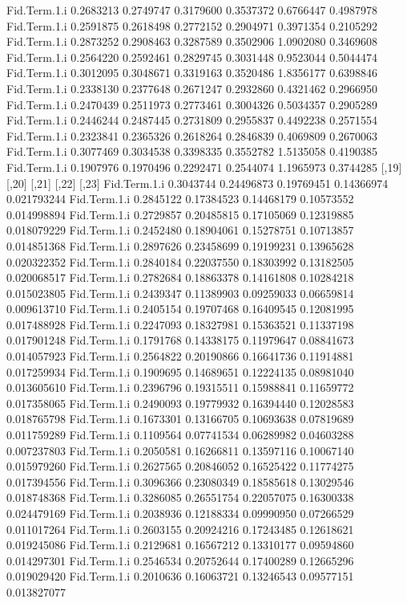 \documentclass[11pt]{article} %
\begin{document}
\begin{Schunk}
\begin{Soutput}
Fid.Term.1.i 0.2683213 0.2749747 0.3179600 0.3537372 0.6766447 0.4987978
Fid.Term.1.i 0.2591875 0.2618498 0.2772152 0.2904971 0.3971354 0.2105292
Fid.Term.1.i 0.2873252 0.2908463 0.3287589 0.3502906 1.0902080 0.3469608
Fid.Term.1.i 0.2564220 0.2592461 0.2829745 0.3031448 0.9523044 0.5044474
Fid.Term.1.i 0.3012095 0.3048671 0.3319163 0.3520486 1.8356177 0.6398846
Fid.Term.1.i 0.2338130 0.2377648 0.2671247 0.2932860 0.4321462 0.2966950
Fid.Term.1.i 0.2470439 0.2511973 0.2773461 0.3004326 0.5034357 0.2905289
Fid.Term.1.i 0.2446244 0.2487445 0.2731809 0.2955837 0.4492238 0.2571554
Fid.Term.1.i 0.2323841 0.2365326 0.2618264 0.2846839 0.4069809 0.2670063
Fid.Term.1.i 0.3077469 0.3034538 0.3398335 0.3552782 1.5135058 0.4190385
Fid.Term.1.i 0.1907976 0.1970496 0.2292471 0.2544074 1.1965973 0.3744285
                 [,19]      [,20]      [,21]      [,22]       [,23]
Fid.Term.1.i 0.3043744 0.24496873 0.19769451 0.14366974 0.021793244
Fid.Term.1.i 0.2845122 0.17384523 0.14468179 0.10573552 0.014998894
Fid.Term.1.i 0.2729857 0.20485815 0.17105069 0.12319885 0.018079229
Fid.Term.1.i 0.2452480 0.18904061 0.15278751 0.10713857 0.014851368
Fid.Term.1.i 0.2897626 0.23458699 0.19199231 0.13965628 0.020322352
Fid.Term.1.i 0.2840184 0.22037550 0.18303992 0.13182505 0.020068517
Fid.Term.1.i 0.2782684 0.18863378 0.14161808 0.10284218 0.015023805
Fid.Term.1.i 0.2439347 0.11389903 0.09259033 0.06659814 0.009613710
Fid.Term.1.i 0.2405154 0.19707468 0.16409545 0.12081995 0.017488928
Fid.Term.1.i 0.2247093 0.18327981 0.15363521 0.11337198 0.017901248
Fid.Term.1.i 0.1791768 0.14338175 0.11979647 0.08841673 0.014057923
Fid.Term.1.i 0.2564822 0.20190866 0.16641736 0.11914881 0.017259934
Fid.Term.1.i 0.1909695 0.14689651 0.12224135 0.08981040 0.013605610
Fid.Term.1.i 0.2396796 0.19315511 0.15988841 0.11659772 0.017358065
Fid.Term.1.i 0.2490093 0.19779932 0.16394440 0.12028583 0.018765798
Fid.Term.1.i 0.1673301 0.13166705 0.10693638 0.07819689 0.011759289
Fid.Term.1.i 0.1109564 0.07741534 0.06289982 0.04603288 0.007237803
Fid.Term.1.i 0.2050581 0.16266811 0.13597116 0.10067140 0.015979260
Fid.Term.1.i 0.2627565 0.20846052 0.16525422 0.11774275 0.017394556
Fid.Term.1.i 0.3096366 0.23080349 0.18585618 0.13029546 0.018748368
Fid.Term.1.i 0.3286085 0.26551754 0.22057075 0.16300338 0.024479169
Fid.Term.1.i 0.2038936 0.12188334 0.09990950 0.07266529 0.011017264
Fid.Term.1.i 0.2603155 0.20924216 0.17243485 0.12618621 0.019245086
Fid.Term.1.i 0.2129681 0.16567212 0.13310177 0.09594860 0.014297301
Fid.Term.1.i 0.2546534 0.20752644 0.17400289 0.12665296 0.019029420
Fid.Term.1.i 0.2010636 0.16063721 0.13246543 0.09577151 0.013827077

\end{Soutput}
\end{Schunk}
\end{document}
